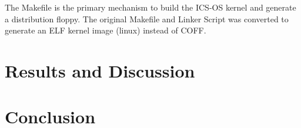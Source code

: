 \documentclass{acm_proc_article-sp}
\begin{document}
The Makefile is the primary mechanism to build the ICS-OS kernel and 
generate a distribution floppy. The original Makefile and Linker Script
was converted to generate an ELF kernel image (linux) instead of COFF.


\section{Results and Discussion}

\section{Conclusion}



\balancecolumns
\end{document}
